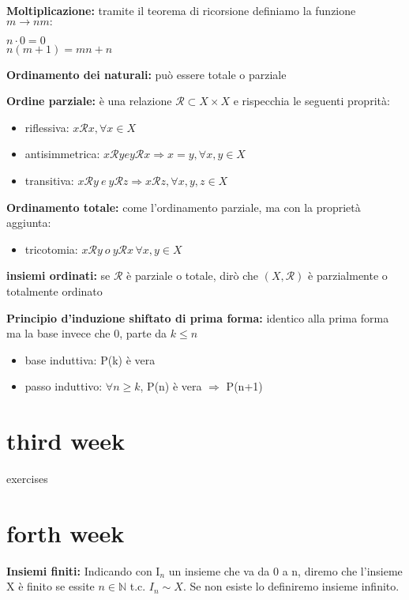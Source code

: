 \documentclass[12pt, a4paper]{article}
\begin{document}
\textbf{Moltiplicazione:} tramite il teorema di ricorsione definiamo la funzione $m\rightarrow nm:$
\begin{center}
    $n\cdot 0 = 0$\\
    $n(m+1)=mn+n$
\end{center}

\textbf{Ordinamento dei naturali:} può essere totale o parziale

\textbf{Ordine parziale:} è una relazione $\mathcal{R}\subset X\times X$ e rispecchia le seguenti proprità:
\begin{itemize}
    \item riflessiva: $x\mathcal{R}x, \forall x\in X$
    \item antisimmetrica: $x\mathcal{R}y e y\mathcal{R} x\Rightarrow x=y, \forall x,y \in X$
    \item transitiva: $x\mathcal{R}y\ e\ y\mathcal{R} z\Rightarrow x\mathcal{R}z, \forall x,y,z \in X$
\end{itemize}

\textbf{Ordinamento totale:} come l'ordinamento parziale, ma con la proprietà aggiunta:
\begin{itemize}
    \item tricotomia: $x\mathcal{R}y\ o\ y\mathcal{R} x\, \forall x,y \in X$
\end{itemize}

\textbf{insiemi ordinati:} se $\mathcal{R}$ è parziale o totale, dirò che $(X,\mathcal{R})$ è 
parzialmente o totalmente ordinato

\textbf{Principio d'induzione shiftato di prima forma:} identico alla prima forma ma la base
invece che 0, parte da $k\leq n$
\begin{itemize}
    \item base induttiva: P(k) è vera
    \item passo induttivo: $\forall n\geq k$, P(n) è vera $\Rightarrow$ P(n+1)
\end{itemize}

\section{third week}
exercises

\newpage
\section{forth week}

\textbf{Insiemi finiti:} Indicando con I$_{n}$ un insieme che va da 0 a n, diremo che l'insieme X è finito
se essite $n\in\mathbb{N}$ t.c. $I_{n}\sim X$. Se non esiste lo definiremo insieme infinito.
\end{document}
